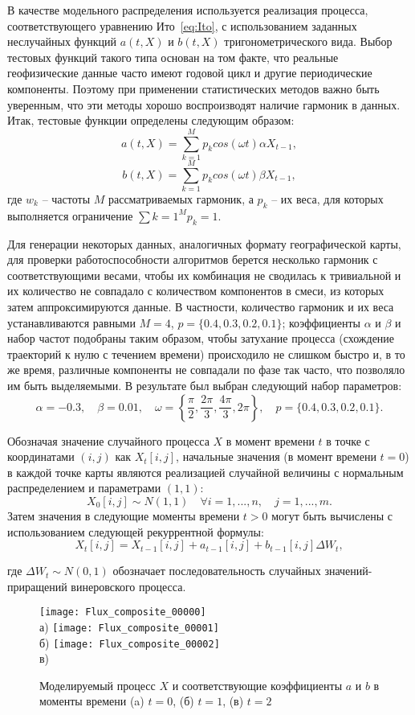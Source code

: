 В качестве модельного распределения используется реализация процесса, соответствующего уравнению Ито~\eqref{eq:Ito}, с использованием заданных неслучайных функций $a(t,X)$ и $b(t,X)$ тригонометрического вида. Выбор тестовых функций такого типа основан на том факте, что реальные геофизические данные часто имеют годовой цикл и другие периодические компоненты. Поэтому при применении статистических методов важно быть уверенным, что эти методы хорошо воспроизводят наличие гармоник в данных. Итак, тестовые функции определены следующим образом:
$$
a(t, X) = \sum\limits_{k=1}^M p_k cos(\omega t) \alpha X_{t-1},
$$
$$
b(t, X) = \sum\limits_{k=1}^M p_k cos(\omega t) \beta X_{t-1},
$$
где $w_k$ -- частоты $M$ рассматриваемых гармоник, а $p_k$ -- их веса, для которых выполняется ограничение $\sum\limits{k=1}^M p_k = 1$.

Для генерации некоторых данных, аналогичных формату географической карты, для проверки работоспособности алгоритмов берется несколько гармоник с соответствующими весами, чтобы их комбинация не сводилась к тривиальной и их количество не совпадало с количеством компонентов в смеси, из которых затем аппроксимируются данные. В частности, количество гармоник и их веса устанавливаются равными $M=4$, $p=\{0.4,0.3,0.2,0.1\}$; коэффициенты $\alpha$ и $\beta$ и набор частот подобраны таким образом, чтобы затухание процесса (схождение траекторий к нулю с течением времени) происходило не слишком быстро и, в то же время, различные компоненты не совпадали по фазе так часто, что позволяло им быть выделяемыми. В результате был выбран следующий набор параметров:
$$
\alpha = -0.3, \quad \beta = 0.01, \quad \omega = \left\{ \frac{\pi}{2}, \frac{2\pi}{3}, \frac{4\pi}{3}, 2\pi \right\}, \quad p=\{0.4, 0.3, 0.2, 0.1\}.
$$

Обозначая значение случайного процесса $X$ в момент времени $t$ в точке с координатами $(i,j)$ как $X_t[i,j]$, начальные значения (в момент времени $t=0$) в каждой точке карты являются реализацией случайной величины с нормальным распределением и параметрами $(1, 1)$:
$$
X_0[i,j] \sim N(1,1) \quad \forall i=1,...,n, \quad j=1,...,m.
$$
Затем значения в следующие моменты времени $t>0$ могут быть вычислены с использованием следующей рекуррентной формулы:
$$
X_t [i,j]= X_{t-1}[i,j] + a_{t-1} [i,j] + b_{t-1}[i,j]\Delta W_t,
$$

где $\Delta W_t \sim N(0,1)$ обозначает последовательность случайных значений-приращений винеровского процесса.

\begin{figure}[!h]
	\centering
	\texttt{[image: Flux\_composite\_00000]}\\
	а)
	\texttt{[image: Flux\_composite\_00001]}\\
	б)
	\texttt{[image: Flux\_composite\_00002]}\\
	в)
	\caption{Моделируемый процесс $X$ и соответствующие коэффициенты $a$ и $b$ в моменты времени (a) $t=0$, (б) $t=1$, (в) $t=2$}
	\label{fig:flux_simulation}
\end{figure}

